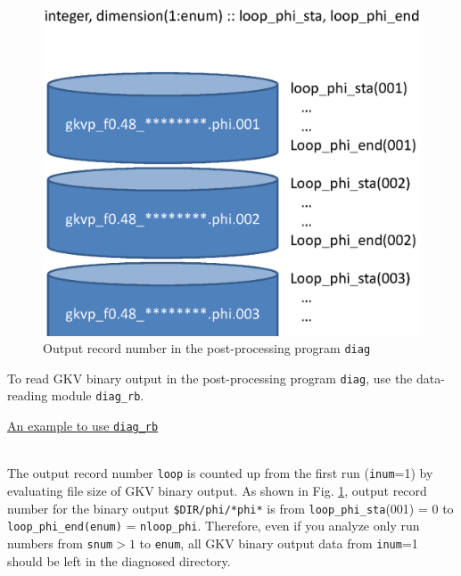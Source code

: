 \begin{figure}[b!]
  \centering
  \includegraphics[scale=0.48]{./appendix/output_record.eps}
  \caption{Output record number in the post-processing program \texttt{diag}}
  \label{fig:output_record_number}
\end{figure}
To read GKV binary output in the post-processing program \texttt{diag}, use the data-reading module \texttt{diag\_rb}.

\underline{An example to use \texttt{diag\_rb}}\\
~~~~

The output record number \texttt{loop} is counted up from the first run (\texttt{inum}=1) by evaluating file size of GKV binary output. As shown in Fig. \ref{fig:output_record_number}, output record number for the binary output \texttt{\$DIR/phi/*phi*} is from \texttt{loop\_phi\_sta}(001) = 0 to \texttt{loop\_phi\_end(enum)} = \texttt{nloop\_phi}. Therefore, even if you analyze only run numbers from \texttt{snum}$>1$ to \texttt{enum}, all GKV binary output data from \texttt{inum}=1 should be left in the diagnosed directory. 

